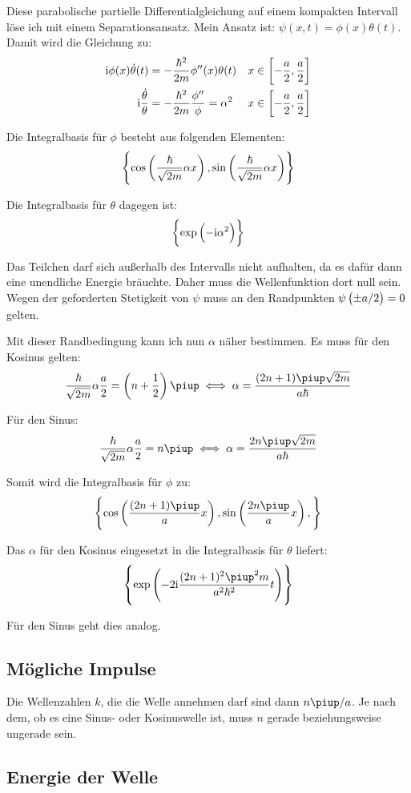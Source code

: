 Diese parabolische partielle Differentialgleichung auf einem kompakten
Intervall löse ich mit einem Separationsansatz. Mein Ansatz ist: $\psi(x, t) =
\phi(x) \theta(t)$. Damit wird die Gleichung zu:
\begin{align*}
	\ii \phi(x) \dot \theta(t) &= -\frac{\hbar^2}{2m} \phi''(x) \theta(t) &x \in \intcc{-\frac a2, \frac a2} \\
	\ii \frac{\dot \theta}\theta &= -\frac{\hbar^2}{2m} \frac{\phi''}\phi = \alpha^2 &x \in \intcc{-\frac a2, \frac a2}
\end{align*}

Die Integralbasis für $\phi$ besteht aus folgenden Elementen:
\[
	\set{
		\cos\del{\frac\hbar{\sqrt{2m}}\alpha x},
		\sin\del{\frac\hbar{\sqrt{2m}}\alpha x}
	}
\]

Die Integralbasis für $\theta$ dagegen ist:
\[
	\set{
		\exp\del{
			- \ii \alpha^2
		}
	}
\]

Das Teilchen darf sich außerhalb des Intervalls nicht aufhalten, da es dafür
dann eine unendliche Energie bräuchte. Daher muss die Wellenfunktion dort null
sein. Wegen der geforderten Stetigkeit von $\psi$ muss an den Randpunkten
$\psi\del{\pm a/2} = 0$ gelten.

Mit dieser Randbedingung kann ich nun $\alpha$ näher bestimmen. Es muss für den
Kosinus gelten:
\[
	\frac\hbar{\sqrt{2m}}\alpha \frac a2 = \del{n + \half} \piup
	\iff
	\alpha = \frac{(2n+1)\piup \sqrt{2m}}{a\hbar}
\]

Für den Sinus:
\[
	\frac\hbar{\sqrt{2m}}\alpha \frac a2 = n\piup
	\iff
	\alpha = \frac{2n\piup \sqrt{2m}}{a\hbar}
\]

Somit wird die Integralbasis für $\phi$ zu:
\[
	\set{
		\cos\del{\frac{(2n+1)\piup}{a} x},
		\sin\del{\frac{2n\piup}{a} x},
	}
\]

Das $\alpha$ für den Kosinus eingesetzt in die Integralbasis für $\theta$
liefert:
\[
	\set{
		\exp\del{
			- 2 \ii \frac{(2n+1)^2\piup^2 m}{a^2\hbar^2} t
		}
	}
\]

Für den Sinus geht dies analog.

\subsection{Mögliche Impulse}

Die Wellenzahlen $k$, die die Welle annehmen darf sind dann $n\piup/a$. Je nach
dem, ob es eine Sinus- oder Kosinuswelle ist, muss $n$ gerade beziehungsweise
ungerade sein.

\subsection{Energie der Welle}

